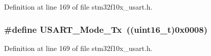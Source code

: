 Definition at line 169 of file stm32f10x\+\_\+usart.\+h.

\subsubsection[{\texorpdfstring{U\+S\+A\+R\+T\+\_\+\+Mode\+\_\+\+Tx}{USART_Mode_Tx}}]{\setlength{\rightskip}{0pt plus 5cm}\#define U\+S\+A\+R\+T\+\_\+\+Mode\+\_\+\+Tx~(({\bf uint16\+\_\+t})0x0008)}\hypertarget{group___u_s_a_r_t___mode_ga22b2813509a062435ea68d086ec565b4}{}\label{group___u_s_a_r_t___mode_ga22b2813509a062435ea68d086ec565b4}


Definition at line 169 of file stm32f10x\+\_\+usart.\+h.

